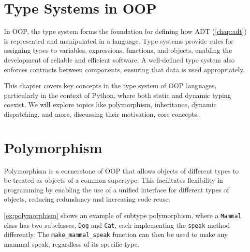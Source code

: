 \documentclass[oneside,11pt,dvipsnames]{book}
\newcommand{\code}[1]{\texttt{#1}}
\begin{document}
\section{Type Systems in OOP}

In OOP, the type system forms the foundation for defining how ADT (\autoref{chap:adt}) is represented and manipulated in a language. Type systems provide rules for assigning types to variables, expressions, functions, and objects, enabling the development of reliable and efficient software. A well-defined type system also enforces contracts between components, ensuring that data is used appropriately.

This chapter covers key concepts in the type system of OOP languages, particularly in the context of Python, where both static and dynamic typing coexist. We will explore topics like polymorphism, inheritance, dynamic dispatching, and more, discussing their motivation, core concepts. 






\section{Polymorphism}

Polymorphism is a cornerstone of OOP that allows objects of different types to be treated as objects of a common supertype. This facilitates flexibility in programming by enabling the use of a unified interface for different types of objects, reducing redundancy and increasing code reuse.

\autoref{ex:polymorphism} shows an example of subtype polymorphism, where a \code{Mammal} class has two subclasses, \code{Dog} and \code{Cat}, each implementing the \code{speak} method differently. The \code{make\_mammal\_speak} function can then be used to make any mammal speak, regardless of its specific type.
\end{document}
